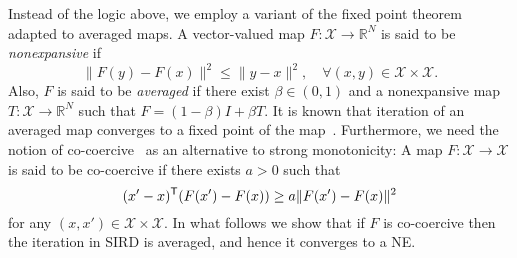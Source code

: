 \documentclass[letterpaper, 10 pt, conference]{ieeeconf}  %
\newcommand{\mc}[1]{\mathcal{#1}}
\newcommand{\bR}{\mathbb{R}}
\newtheorem{defin}{Definition}
\begin{document}
Instead of the logic above, we employ a variant of the fixed point theorem adapted to averaged maps.
A vector-valued map $F:\mc{X}\to\bR^N$ is said to be \emph{nonexpansive} if
\[
 \|F(y)-F(x)\|^2 \leq \|y-x\|^2,\quad \forall (x,y)\in\mc{X}\times\mc{X}.
\]
Also, $F$ is said to be \emph{averaged} if there exist $\beta\in(0,1)$ and a nonexpansive map $T:\mc{X}\to\bR^N$ such that $F=(1-\beta)I+\beta T$.
It is known that iteration of an averaged map converges to a fixed point of the map~\cite[Theorem 2.1]{Byrne2003Unified}.
Furthermore, we need the notion of co-coercive~\cite[Definition 2.3.9]{Facchinei2003Finite} as an alternative to strong monotonicity:
A map $F:\mc{X}\to\mc{X}$ is said to be co-coercive if there exists $a>0$ such that
\[
 (x'-x)^{\sf T}(F(x')-F(x)) \geq a\|F(x')-F(x)\|^2
\]
for any $(x,x')\in\mc{X}\times\mc{X}$.
In what follows we show that if $F$ is co-coercive then the iteration in SIRD is averaged,
and hence it converges to a NE.
\end{document}
